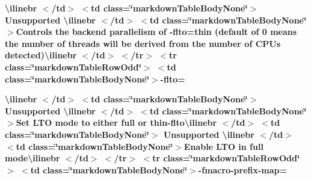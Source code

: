 \begin{longtabu}
{\bfseries{{\ttfamily \textbackslash{}ilinebr \texorpdfstring{$<$}{<}/td\texorpdfstring{$>$}{>} \texorpdfstring{$<$}{<}td class=\char`\"{}markdown\+Table\+Body\+None\char`\"{}\texorpdfstring{$>$}{>} Unsupported \textbackslash{}ilinebr \texorpdfstring{$<$}{<}/td\texorpdfstring{$>$}{>} \texorpdfstring{$<$}{<}td class=\char`\"{}markdown\+Table\+Body\+None\char`\"{}\texorpdfstring{$>$}{>}}Controls the backend parallelism of -\/flto=thin (default of 0 means the number of threads will be derived from the number of CPUs detected){\ttfamily \textbackslash{}ilinebr \texorpdfstring{$<$}{<}/td\texorpdfstring{$>$}{>} \texorpdfstring{$<$}{<}/tr\texorpdfstring{$>$}{>} \texorpdfstring{$<$}{<}tr class=\char`\"{}markdown\+Table\+Row\+Odd\char`\"{}\texorpdfstring{$>$}{>} \texorpdfstring{$<$}{<}td class=\char`\"{}markdown\+Table\+Body\+None\char`\"{}\texorpdfstring{$>$}{>}}-\/flto=}}

{\bfseries{{\ttfamily \textbackslash{}ilinebr \texorpdfstring{$<$}{<}/td\texorpdfstring{$>$}{>} \texorpdfstring{$<$}{<}td class=\char`\"{}markdown\+Table\+Body\+None\char`\"{}\texorpdfstring{$>$}{>} Unsupported \textbackslash{}ilinebr \texorpdfstring{$<$}{<}/td\texorpdfstring{$>$}{>} \texorpdfstring{$<$}{<}td class=\char`\"{}markdown\+Table\+Body\+None\char`\"{}\texorpdfstring{$>$}{>}}Set LTO mode to either \textquotesingle{}full\textquotesingle{} or \textquotesingle{}thin-\/flto{\ttfamily \textbackslash{}ilinebr \texorpdfstring{$<$}{<}/td\texorpdfstring{$>$}{>} \texorpdfstring{$<$}{<}td class=\char`\"{}markdown\+Table\+Body\+None\char`\"{}\texorpdfstring{$>$}{>} Unsupported \textbackslash{}ilinebr \texorpdfstring{$<$}{<}/td\texorpdfstring{$>$}{>} \texorpdfstring{$<$}{<}td class=\char`\"{}markdown\+Table\+Body\+None\char`\"{}\texorpdfstring{$>$}{>}}Enable LTO in \textquotesingle{}full\textquotesingle{} mode{\ttfamily \textbackslash{}ilinebr \texorpdfstring{$<$}{<}/td\texorpdfstring{$>$}{>} \texorpdfstring{$<$}{<}/tr\texorpdfstring{$>$}{>} \texorpdfstring{$<$}{<}tr class=\char`\"{}markdown\+Table\+Row\+Odd\char`\"{}\texorpdfstring{$>$}{>} \texorpdfstring{$<$}{<}td class=\char`\"{}markdown\+Table\+Body\+None\char`\"{}\texorpdfstring{$>$}{>}}-\/fmacro-\/prefix-\/map=}}


\end{longtabu}
